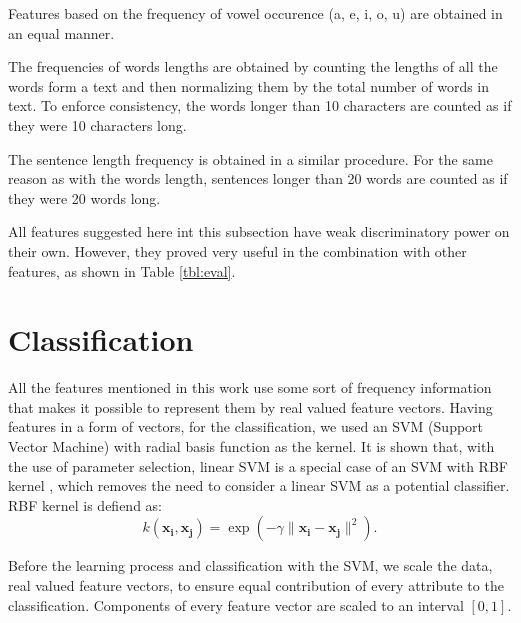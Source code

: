 \documentclass{llncs}
\begin{document}
Features based on the frequency of vowel occurence (a, e, i, o, u) are
obtained in an equal manner.

The frequencies of words lengths are obtained by counting the lengths of all
the words form a text and then normalizing them by the total number of words in
text. To enforce consistency, the words longer than 10 characters are counted as
if they were 10 characters long.

The sentence length frequency is obtained in a similar procedure.
For the same reason as with the words length, sentences longer than 20 words are
counted as if they were 20 words long.

All features suggested here int this subsection have weak discriminatory power
on their own. However, they proved very useful in the combination with other features, as
shown in Table \ref{tbl:eval}.

\section{Classification}
All the features mentioned in this work use some sort of frequency information
that makes it possible to represent them by real valued feature vectors. Having
features in a form of vectors, for the classification, we used an SVM (Support
Vector Machine) with radial basis function as the kernel. It is shown that, with
the use of parameter selection, linear SVM is a special case of an SVM with RBF
kernel \cite{keerthi2003asymptotic}, which removes the need to consider a linear
SVM as a potential classifier. RBF kernel is defiend as:
\begin{equation}
k(\mathbf{x_i},\mathbf{x_j})=\exp(-\gamma \|\mathbf{x_i} - \mathbf{x_j}\|^2).
\end{equation}

Before the learning process and classification with the SVM, we scale the data,
real valued feature vectors, to ensure equal contribution of every attribute to
the classification. Components of every feature vector are scaled to an interval
$[0, 1]$.
\end{document}
